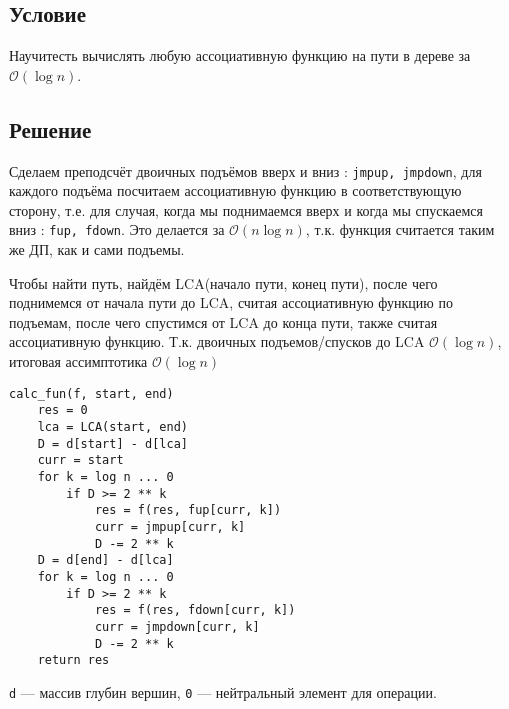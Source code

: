 \documentclass[12pt, a4paper]{article}
\begin{document}
\subsection*{Условие}

Научитесть вычислять любую ассоциативную функцию на пути в дереве за $\mathcal O(\log n)$.

\subsection*{Решение}

Сделаем преподсчёт двоичных подъёмов вверх и вниз : \texttt{jmpup, jmpdown}, для каждого подъёма посчитаем ассоциативную функцию в соответствующую сторону, т.е. для случая, когда мы поднимаемся вверх и когда мы спускаемся вниз : \texttt{fup, fdown}. Это делается за $\mathcal O(n\log n)$, т.к. функция считается таким же ДП, как и сами подъемы.

Чтобы найти путь, найдём LCA(начало пути, конец пути), после чего поднимемся от начала пути до LCA, считая ассоциативную функцию по подъемам, после чего спустимся от LCA до конца пути, также считая ассоциативную функцию. Т.к. двоичных подъемов/спусков до LCA $\mathcal O(\log n)$, итоговая ассимптотика $\mathcal O(\log n)$

\begin{lstlisting}
calc_fun(f, start, end)
    res = 0
    lca = LCA(start, end)
    D = d[start] - d[lca]
    curr = start
    for k = log n ... 0
        if D >= 2 ** k
            res = f(res, fup[curr, k])
            curr = jmpup[curr, k]
            D -= 2 ** k
    D = d[end] - d[lca]
    for k = log n ... 0
        if D >= 2 ** k
            res = f(res, fdown[curr, k])
            curr = jmpdown[curr, k]
            D -= 2 ** k
    return res
\end{lstlisting}

\texttt{d} --- массив глубин вершин, \texttt{0} --- нейтральный элемент для операции.
\end{document}
